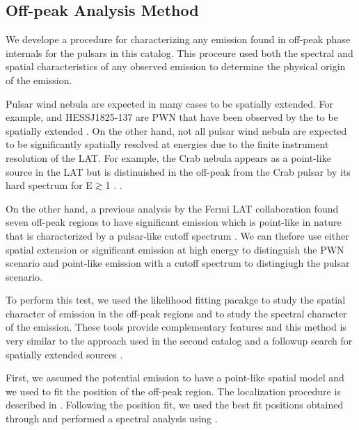 \subsection{Off-peak Analysis Method}
\label{subsec:off_peak_analysis}

We develope a procedure for characterizing any emission found
in off-peak phase internals for the pulsars in this catalog.  
This proceure used both the spectral and spatial characteristics
of any observed emission to determine the physical origin of the emission.

Pulsar wind nebula are expected in many cases to be spatially
extended. For example, \velax and HESS\;J1825-137 are PWN
that have been observed by the \lat to be spatially extended
\citep{LAT_collaboration_Vela_X_2010,LAT_collaboration_HESS_J1825_2011}.
On the other hand, not all pulsar wind nebula are expected to be
significantly spatially resolved at \gev energies due to the finite
instrument resolution of the LAT. For example, the Crab nebula appears
as a point-like source in the LAT but is distinuished in the off-peak
from the Crab pulsar by its hard spectrum for E$\gtrsim$1 \gev.
\citep{LAT_collaboration_crab_2010}.

On the other hand, a previous analysis by the Fermi LAT collaboration
found seven off-peak regions to have significant emission which is
point-like in nature that is characterized by a pulsar-like cutoff
spectrum \citep{LAT_collaboration_PWNCAT_2011}.  We can thefore use
either spatial extension or significant emission at high energy to
distinguish the PWN scenario and point-like emission with a cutoff
spectrum to distingiugh the pulsar scenario.

To perform this test, we used the likelihood fitting pacakge \pointlike to study
the spatial character of emission in the off-peak regions and \gtlike to
study the spectral character of the emission. These tools provide complementary
features and this method is very similar to the approach used in the
second \lat catalog \citep{LAT_Collaboration_2FGL_2012}
and a followup search for spatially extended sources 
\citep{LAT_collaboration_extended_search_2012}.

First, we assumed the potential emission to have a point-like spatial model
and we used \pointlike to fit the position of 
the off-peak region. The localization procedure is described in \cite{LAT_Collaboration_2FGL_2012}. 
Following the position fit, we used the best fit positions
obtained through \pointlike and performed a spectral analysis using \gtlike.

